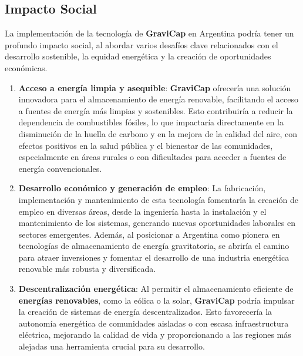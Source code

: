             \subsection{Impacto Social}
                La implementación de la tecnología de \textcolor{dark_violet}{\textbf{GraviCap}} en Argentina podría tener un profundo impacto social, al abordar varios desafíos clave relacionados con el desarrollo sostenible, la equidad energética y la creación de oportunidades económicas.\par
                \begin{enumerate}
                    \setlength{\itemindent}{2.5em}
                    
                    \item \textbf{Acceso a energía limpia y asequible}: \textcolor{dark_violet}{\textbf{GraviCap}} ofrecería una solución innovadora para el almacenamiento de energía renovable, facilitando el acceso a fuentes de energía más limpias y sostenibles. Esto contribuiría a reducir la dependencia de combustibles fósiles, lo que impactaría directamente en la disminución de la huella de carbono y en la mejora de la calidad del aire, con efectos positivos en la salud pública y el bienestar de las comunidades, especialmente en áreas rurales o con dificultades para acceder a fuentes de energía convencionales.\par
                    \item \textbf{Desarrollo económico y generación de empleo}: La fabricación, implementación y mantenimiento de esta tecnología fomentaría la creación de empleo en diversas áreas, desde la ingeniería hasta la instalación y el mantenimiento de los sistemas, generando nuevas oportunidades laborales en sectores emergentes. Además, al posicionar a Argentina como pionera en tecnologías de almacenamiento de energía gravitatoria, se abriría el camino para atraer inversiones y fomentar el desarrollo de una industria energética renovable más robusta y diversificada.\par
                    \item \textbf{Descentralización energética}: Al permitir el almacenamiento eficiente de \textbf{energías renovables}, como la eólica o la solar, \textcolor{dark_violet}{\textbf{GraviCap}} podría impulsar la creación de sistemas de energía descentralizados. Esto favorecería la autonomía energética de comunidades aisladas o con escasa infraestructura eléctrica, mejorando la calidad de vida y proporcionando a las regiones más alejadas una herramienta crucial para su desarrollo.\par

\end{enumerate}
